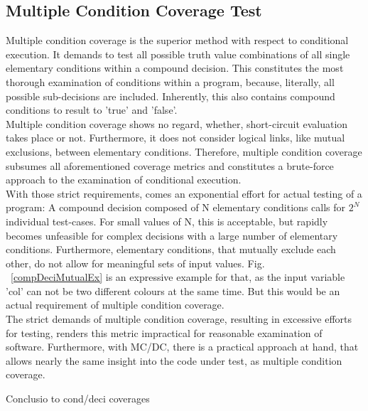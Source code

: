 	\subsection{Multiple Condition Coverage Test}
	Multiple condition coverage is the superior method with respect to conditional execution. It demands to test all possible truth value combinations of all single elementary conditions within a compound decision. This constitutes the most thorough examination of conditions within a program, because, literally, all possible sub-decisions are included. Inherently, this also contains compound conditions to result to 'true' and 'false'. \\
	Multiple condition coverage shows no regard, whether, short-circuit evaluation takes place or not. Furthermore, it does not consider logical links, like mutual exclusions, between elementary conditions. Therefore, multiple condition coverage subsumes all aforementioned coverage metrics and constitutes a brute-force approach to the examination of conditional execution.\\ 
	With those strict requirements, comes an exponential effort for actual testing of a program: A compound decision composed of N elementary conditions calls for $ 2^N $ individual test-cases. For small values of N, this is acceptable, but rapidly becomes unfeasible for complex decisions with a large number of elementary conditions. Furthermore, elementary conditions, that mutually exclude each other, do not allow for meaningful sets of input values. Fig. ~\ref{compDeciMutualEx} is an expressive example for that, as the input variable 'col' can not be two different colours at the same time. But this would be an actual requirement of multiple condition coverage. \\
	The strict demands of multiple condition coverage, resulting in excessive efforts for testing, renders this metric impractical for reasonable examination of software. Furthermore, with MC/DC, there is a practical approach at hand, that allows nearly the same insight into the code under test, as multiple condition coverage. 
	
	Conclusio to cond/deci coverages
	
